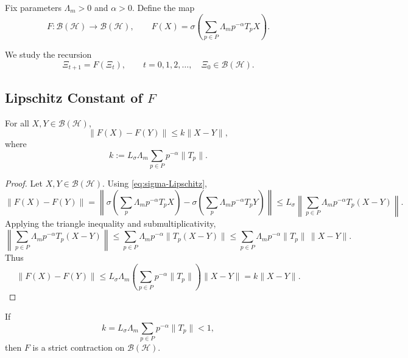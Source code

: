 \documentclass[12pt]{article}
\begin{document}
Fix parameters \(\Lambda_m > 0\) and \(\alpha > 0\). Define the map
\begin{equation}
  F:\mathcal{B}(\mathcal{H})\to\mathcal{B}(\mathcal{H}),
  \qquad
  F(X) = \sigma\!\left(\sum_{p\in P} \Lambda_m p^{-\alpha} T_p X\right).
  \label{eq:F-def-appendix}
\end{equation}

We study the recursion
\begin{equation}
  \Xi_{t+1} = F(\Xi_t), \qquad t=0,1,2,\dots,\quad \Xi_0\in\mathcal{B}(\mathcal{H}).
  \label{eq:Xi-recursion-appendix}
\end{equation}

\subsection{Lipschitz Constant of \(F\)}

\begin{proposition}
\label{prop:F-Lipschitz}
For all \(X,Y\in\mathcal{B}(\mathcal{H})\),
\[
  \|F(X)-F(Y)\|
  \le
  k\|X-Y\|,
\]
where
\begin{equation}
  k := L_\sigma \Lambda_m \sum_{p\in P} p^{-\alpha} \|T_p\|.
  \label{eq:k-definition-appendix}
\end{equation}
\end{proposition}

\begin{proof}
Let \(X,Y\in\mathcal{B}(\mathcal{H})\). Using \eqref{eq:sigma-Lipschitz},
\[
  \|F(X)-F(Y)\|
  =
  \left\|\sigma\!\left(\sum_{p} \Lambda_m p^{-\alpha} T_p X\right)
  -
  \sigma\!\left(\sum_{p} \Lambda_m p^{-\alpha} T_p Y\right)\right\|
  \le
  L_\sigma \left\|\sum_{p\in P} \Lambda_m p^{-\alpha} T_p (X-Y)\right\|.
\]
Applying the triangle inequality and submultiplicativity,
\[
  \left\|\sum_{p\in P} \Lambda_m p^{-\alpha} T_p (X-Y)\right\|
  \le
  \sum_{p\in P} \Lambda_m p^{-\alpha} \|T_p (X-Y)\|
  \le
  \sum_{p\in P} \Lambda_m p^{-\alpha} \|T_p\|\,\|X-Y\|.
\]
Thus
\[
  \|F(X)-F(Y)\|
  \le
  L_\sigma \Lambda_m \left(\sum_{p\in P} p^{-\alpha}\|T_p\|\right) \|X-Y\|
  = k \|X-Y\|.
\]
\end{proof}

\begin{corollary}
\label{cor:appendix-contraction-cond}
If
\[
  k = L_\sigma \Lambda_m \sum_{p\in P} p^{-\alpha}\|T_p\| < 1,
\]
then \(F\) is a strict contraction on \(\mathcal{B}(\mathcal{H})\).
\end{corollary}
\end{document}
